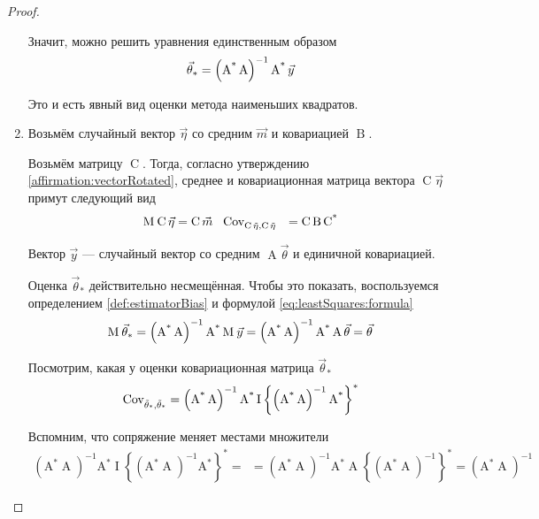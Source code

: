 \begin{proof}
\begin{enumerate}
      Значит, можно решить уравнения единственным образом
      \begin{equation}\label{eq:leastSquares:formula}
          \index{оценка!метода наименьших квадратов!формула}
          \vec{\theta}_*
          = \left( \operatorname{A^*} \operatorname{A} \right)^{-1}
        \operatorname{A^*} \vec{y}
      \end{equation}

      Это и есть явный вид оценки метода наименьших квадратов.

      \item Возьмём случайный вектор $\vec{\eta}$ со средним $\vec{m}$
      и ковариацией $\operatorname{B}$.
      
      Возьмём матрицу $\operatorname{C}$. Тогда, согласно утверждению
      \ref{affirmation:vectorRotated}, среднее и ковариационная матрица
      вектора $\operatorname{C}\vec{\eta}$ примут следующий вид
      \begin{align*}
          \operatorname{M}_{} \operatorname{C}\vec{\eta}
        &= \operatorname{C} \vec{m}\ \
          \operatorname{Cov^{}_{\operatorname{C} \vec{\eta}, \operatorname{C} \vec{\eta}}}
        &= \operatorname{C} \operatorname{B} \operatorname{C^*}
      \end{align*}

      Вектор $\vec{y}$ --- случайный вектор со средним
      $\operatorname{A} \vec{\theta}$ и единичной ковариацией.

      Оценка $\vec{\theta}_*$ действительно несмещённая. Чтобы это
      показать, воспользуемся определением \ref{def:estimatorBias}
      и формулой \ref{eq:leastSquares:formula}
      \begin{align*}
          \operatorname{M}_{} \vec{\theta}_*
          = \left( \operatorname{A^*} \operatorname{A} \right)^{-1}
        \operatorname{A^*} \operatorname{M}_{} \vec{y}
          = \left( \operatorname{A^*} \operatorname{A} \right)^{-1}
        \operatorname{A^*} \operatorname{A} \vec{\theta}
          = \vec{\theta}
      \end{align*}

      Посмотрим, какая у оценки ковариационная матрица $\vec{\theta}_*$
      \begin{align*}
          \operatorname{Cov^{}_{\vec{\theta}_*, \vec{\theta}_*}}
          = \left( \operatorname{A^*} \operatorname{A} \right)^{-1}
        \operatorname{A^*} \operatorname{I} \left\{
            \left( \operatorname{A^*} \operatorname{A} \right)^{-1}
        \operatorname{A^*} \right\}^*
      \end{align*}

      Вспомним, что сопряжение меняет местами множители
      \begin{align*}
          \left( \operatorname{A^*} \operatorname{A} \right)^{-1}
        \operatorname{A^*} \operatorname{I} \left\{
            \left( \operatorname{A^*} \operatorname{A} \right)^{-1}
        \operatorname{A^*} \right\}^* = \ \
          = \left( \operatorname{A^*} \operatorname{A} \right)^{-1}
        \operatorname{A^*} \operatorname{A}
        \left\{ \left( \operatorname{A^*} \operatorname{A}
            \right)^{-1} \right\}^*
          = \left( \operatorname{A^*} \operatorname{A} \right)^{-1}
      \end{align*}


\end{enumerate}
\end{proof}
